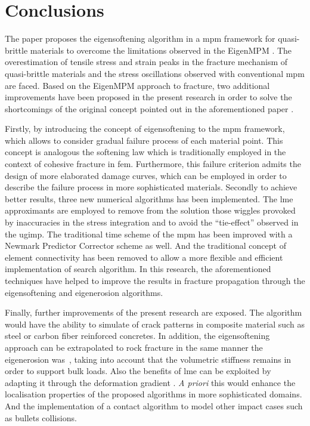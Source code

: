 \documentclass[preprint,12pt,a4paper]{elsarticle}
\begin{document}

\section{Conclusions}
\label{sec:4}

The paper proposes the eigensoftening algorithm in a \acrshort{mpm} framework for quasi-brittle materials to overcome the limitations observed in the EigenMPM \cite{Zhang_EE_2020}. The overestimation of tensile 
stress and strain peaks in the fracture mechanism of quasi-brittle
materials and the stress oscillations observed with conventional
\acrshort{mpm} are faced. Based on the
EigenMPM approach to fracture, two additional improvements have been proposed in the present research in order to solve the shortcomings of the original concept pointed out in the aforementioned paper \cite{Zhang_EE_2020}.

Firstly, by introducing the concept of eigensoftening to the \acrshort{mpm} framework,
which allows to consider gradual failure process of each material point. This concept is analogous the softening law which is traditionally employed in the context
of cohesive fracture in \acrshort{fem}. Furthermore, this failure
criterion admits the design of more elaborated damage curves, which
can be employed in order to describe the failure process in more
sophisticated materials. Secondly to achieve better results, three new
numerical algorithms has been implemented. The \acrshort{lme}
approximants are employed to remove from
the solution those wiggles provoked by inaccuracies in the stress
integration and to avoid the ``tie-effect'' observed in the
\acrshort{ugimp}. The traditional time scheme of the \acrshort{mpm}
has been improved with a Newmark Predictor Corrector scheme as
well. And the traditional concept of element connectivity has been
removed to allow a more flexible and efficient implementation of
search algorithm. In this research, the aforementioned techniques have helped
to improve the results in fracture propagation through the
eigensoftening and eigenerosion algorithms.

Finally, further improvements of the present research are exposed. The
algorithm would have the ability to simulate of crack patterns in
composite material such as steel or carbon fiber reinforced
concretes\cite{Navas_2018_ES,Ruiz2019}. In addition, the eigensoftening
approach can be extrapolated to rock fracture in the same manner the
eigenerosion was~\cite{Wang2017}, taking into account that the
volumetric stiffness remains in order to support bulk loads. Also the
benefits of \acrshort{lme} can be exploited by adapting it through the
deformation gradient \cite{Kochmann2019}. \textit{A priori} this would
enhance the localisation properties of the proposed algorithms in more
sophisticated domains. And the implementation of a contact algorithm to model other impact cases such as bullets collisions. 
\end{document}
